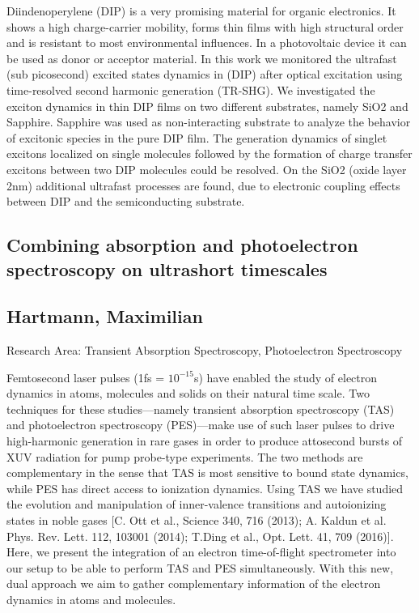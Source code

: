 \noindent Diindenoperylene (DIP) is a very promising material for organic electronics. It shows a high charge-carrier mobility, forms thin films with high structural order and is resistant to most environmental influences. In a photovoltaic device it can be used as donor or acceptor material. In this work we monitored the ultrafast (sub picosecond) excited states dynamics in (DIP) after optical excitation using time-resolved second harmonic generation (TR-SHG). We investigated the exciton dynamics in thin DIP films on two different substrates, namely SiO2 and Sapphire. Sapphire was used as non-interacting substrate to analyze the behavior of excitonic species in the pure DIP film. The generation dynamics of singlet excitons localized on single molecules followed by the formation of charge transfer excitons between two DIP molecules could be resolved. On the SiO2 (oxide layer 2nm) additional ultrafast processes are found, due to electronic coupling effects between DIP and the semiconducting substrate.
\newpage

\subsection*{\centering \large Combining absorption and photoelectron spectroscopy on ultrashort timescales}
\subsection*{\centering \normalsize Hartmann, Maximilian}
Research Area: Transient Absorption Spectroscopy, Photoelectron Spectroscopy\newline

\noindent Femtosecond laser pulses (1fs = $10^{-15}$s) have enabled the study of electron dynamics in atoms, molecules and solids on their natural time scale. \newline
Two techniques for these studies---namely transient absorption spectroscopy (TAS) and photoelectron spectroscopy (PES)---make use of such laser pulses to drive high-harmonic generation in rare gases in order to produce attosecond bursts of XUV radiation for pump probe-type experiments. The two methods are complementary in the sense that TAS is most sensitive to bound state dynamics, while PES has direct access to ionization dynamics.\newline
Using TAS we have studied the evolution and manipulation of inner-valence transitions and autoionizing states in noble gases [C. Ott et al., Science 340, 716 (2013); A. Kaldun et al. Phys. Rev. Lett. 112, 103001 (2014); T.Ding et al., Opt. Lett. 41, 709 (2016)]. Here, we present the integration of an electron time-of-flight spectrometer into our setup to be able to perform TAS and PES simultaneously. With this new, dual approach we aim to gather complementary information of the electron dynamics in atoms and molecules.


